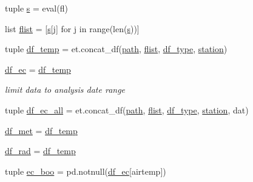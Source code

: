 \begin{DoxyCompactItemize}
tuple \hyperlink{namespace_preprocess_01_d_r_af55803ec5bfdac4f81d9c47966d0aff1}{s} = eval(fl)
\item 
list \hyperlink{namespace_preprocess_01_d_r_afda23e41cb65dc5791e2e602863d22a6}{flist} = \mbox{[}\hyperlink{namespace_preprocess_01_d_r_af55803ec5bfdac4f81d9c47966d0aff1}{s}\mbox{[}j\mbox{]} for j in range(len(\hyperlink{namespace_preprocess_01_d_r_af55803ec5bfdac4f81d9c47966d0aff1}{s}))\mbox{]}
\item 
tuple \hyperlink{namespace_preprocess_01_d_r_a8170ab278e5e65c4c35be6d3eaa3f5b9}{df\+\_\+temp} = et.\+concat\+\_\+df(\hyperlink{namespace_preprocess_01_d_r_afebb93b679a374da12eb4267b59fb9f8}{path}, \hyperlink{namespace_preprocess_01_d_r_afda23e41cb65dc5791e2e602863d22a6}{flist}, \hyperlink{namespace_preprocess_01_d_r_a8179dd2e8d60a0dc3d9dff36cc8ea97e}{df\+\_\+type}, \hyperlink{namespace_preprocess_01_d_r_aae6f3cd9de873f4f53dd09d43f047642}{station})
\item 
\hyperlink{namespace_preprocess_01_d_r_a6afbb82db5a6278359661ab35a56be0b}{df\+\_\+ec} = \hyperlink{namespace_preprocess_01_d_r_a8170ab278e5e65c4c35be6d3eaa3f5b9}{df\+\_\+temp}
\begin{DoxyCompactList}\small\item\em limit data to analysis date range \end{DoxyCompactList}\item 
tuple \hyperlink{namespace_preprocess_01_d_r_a416dccd46e76a20b33904f972fe464df}{df\+\_\+ec\+\_\+all} = et.\+concat\+\_\+df(\hyperlink{namespace_preprocess_01_d_r_afebb93b679a374da12eb4267b59fb9f8}{path}, \hyperlink{namespace_preprocess_01_d_r_afda23e41cb65dc5791e2e602863d22a6}{flist}, \hyperlink{namespace_preprocess_01_d_r_a8179dd2e8d60a0dc3d9dff36cc8ea97e}{df\+\_\+type}, \hyperlink{namespace_preprocess_01_d_r_aae6f3cd9de873f4f53dd09d43f047642}{station}, \textquotesingle{}dat\textquotesingle{})
\item 
\hyperlink{namespace_preprocess_01_d_r_a76371d4dc94517f100a4b6c2a44a66e9}{df\+\_\+met} = \hyperlink{namespace_preprocess_01_d_r_a8170ab278e5e65c4c35be6d3eaa3f5b9}{df\+\_\+temp}
\item 
\hyperlink{namespace_preprocess_01_d_r_ad42c5899e061416e7420e073b0a4eae4}{df\+\_\+rad} = \hyperlink{namespace_preprocess_01_d_r_a8170ab278e5e65c4c35be6d3eaa3f5b9}{df\+\_\+temp}
\item 
tuple \hyperlink{namespace_preprocess_01_d_r_a00e73208d968dff947b8535a5c1fb9d9}{ec\+\_\+boo} = pd.\+notnull(\hyperlink{namespace_preprocess_01_d_r_a6afbb82db5a6278359661ab35a56be0b}{df\+\_\+ec}\mbox{[}\textquotesingle{}airtemp\textquotesingle{}\mbox{]})

\end{DoxyCompactItemize}
